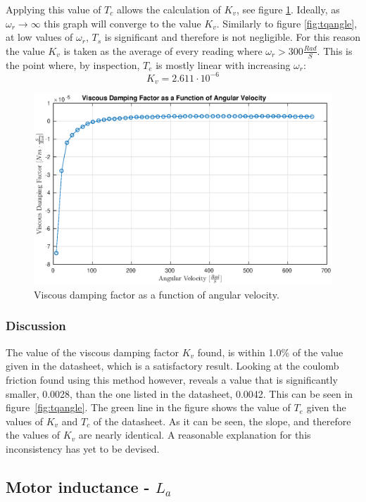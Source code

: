 Applying this value of $T_c$ allows the calculation of $K_v$, see figure \ref{fig:visvel}.
Ideally, as $\omega_r\rightarrow \infty$ this graph will converge to the value $K_v$. 
Similarly to figure \ref{fig:tqangle}, at low values of $\omega_r$, $T_s$ is significant and therefore is not negligible.
For this reason the value $K_v$ is taken as the average of every reading where $\omega_r>300\frac{Rad}{S}$. 
This is the point where, by inspection, $T_e$ is mostly linear with increasing $\omega_r$:
$$K_v=2.611\cdot 10^{-6}$$
\begin{figure}[!h]
	\centering
	\includegraphics[width=.75\linewidth]{graphics/visvel}
	\caption{Viscous damping factor as a function of angular velocity.}
	\label{fig:visvel}
\end{figure}
\subsubsection{Discussion}
The value of the viscous damping factor $K_v$ found, is within 1.0\% of the value given in the datasheet, which is a satisfactory result.
Looking at the coulomb friction found using this method however, reveals a value that is significantly smaller, 0.0028, than the one listed in the datasheet, 0.0042.
This can be seen in figure~\ref{fig:tqangle}. 
The green line in the figure shows the value of $T_e$ given the values of $K_v$ and $T_c$ of the datasheet.
As it can be seen, the slope, and therefore the values of $K_v$ are nearly identical.
A reasonable explanation for this inconsistency has yet to be devised.

\subsection{Motor inductance - $L_a$}
\label{sec:incuctance}
